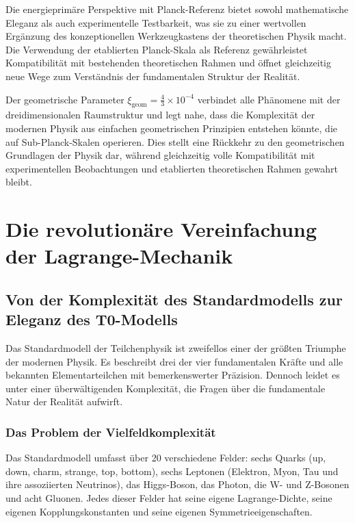 \documentclass[12pt,a4paper]{report}
\newcommand{\xigeom}{\xi_{\text{geom}}}   %
\begin{document}
	Die energieprimäre Perspektive mit Planck-Referenz bietet sowohl mathematische Eleganz als auch experimentelle Testbarkeit, was sie zu einer wertvollen Ergänzung des konzeptionellen Werkzeugkastens der theoretischen Physik macht. Die Verwendung der etablierten Planck-Skala als Referenz gewährleistet Kompatibilität mit bestehenden theoretischen Rahmen und öffnet gleichzeitig neue Wege zum Verständnis der fundamentalen Struktur der Realität.
	
	Der geometrische Parameter $\xigeom = \frac{4}{3} \times 10^{-4}$ verbindet alle Phänomene mit der dreidimensionalen Raumstruktur und legt nahe, dass die Komplexität der modernen Physik aus einfachen geometrischen Prinzipien entstehen könnte, die auf Sub-Planck-Skalen operieren. Dies stellt eine Rückkehr zu den geometrischen Grundlagen der Physik dar, während gleichzeitig volle Kompatibilität mit experimentellen Beobachtungen und etablierten theoretischen Rahmen gewahrt bleibt.
	\chapter{Die revolutionäre Vereinfachung der Lagrange-Mechanik}
	\label{chap:lagrange}
	
	\section{Von der Komplexität des Standardmodells zur Eleganz des T0-Modells}
	
	Das Standardmodell der Teilchenphysik ist zweifellos einer der größten Triumphe der modernen Physik. Es beschreibt drei der vier fundamentalen Kräfte und alle bekannten Elementarteilchen mit bemerkenswerter Präzision. Dennoch leidet es unter einer überwältigenden Komplexität, die Fragen über die fundamentale Natur der Realität aufwirft.
	
	\subsection{Das Problem der Vielfeldkomplexität}
	
	Das Standardmodell umfasst über 20 verschiedene Felder: sechs Quarks (up, down, charm, strange, top, bottom), sechs Leptonen (Elektron, Myon, Tau und ihre assoziierten Neutrinos), das Higgs-Boson, das Photon, die W- und Z-Bosonen und acht Gluonen. Jedes dieser Felder hat seine eigene Lagrange-Dichte, seine eigenen Kopplungskonstanten und seine eigenen Symmetrieeigenschaften.
	
\end{document}
